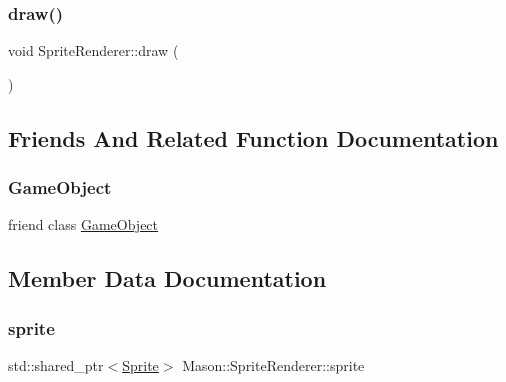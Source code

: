 \subsubsection{\texorpdfstring{draw()}{draw()}}
{\footnotesize\ttfamily void Sprite\+Renderer\+::draw (\begin{DoxyParamCaption}{ }\end{DoxyParamCaption})}



\subsection{Friends And Related Function Documentation}
\hypertarget{class_mason_1_1_sprite_renderer_a00df87c957d8f7ee0fc51f07a0542f4a}{}\label{class_mason_1_1_sprite_renderer_a00df87c957d8f7ee0fc51f07a0542f4a} 
\subsubsection{\texorpdfstring{Game\+Object}{GameObject}}
{\footnotesize\ttfamily friend class \hyperlink{class_mason_1_1_game_object}{Game\+Object}\hspace{0.3cm}{\ttfamily [friend]}}



\subsection{Member Data Documentation}
\hypertarget{class_mason_1_1_sprite_renderer_a17a9d82d45d7ae1058542e5c939122c6}{}\label{class_mason_1_1_sprite_renderer_a17a9d82d45d7ae1058542e5c939122c6} 
\subsubsection{\texorpdfstring{sprite}{sprite}}
{\footnotesize\ttfamily std\+::shared\+\_\+ptr$<$\hyperlink{class_mason_1_1_sprite}{Sprite}$>$ Mason\+::\+Sprite\+Renderer\+::sprite}

\hypertarget{class_mason_1_1_sprite_renderer_a6f117cc02c8fc27dac5692a2127bf329}{}\label{class_mason_1_1_sprite_renderer_a6f117cc02c8fc27dac5692a2127bf329} 
